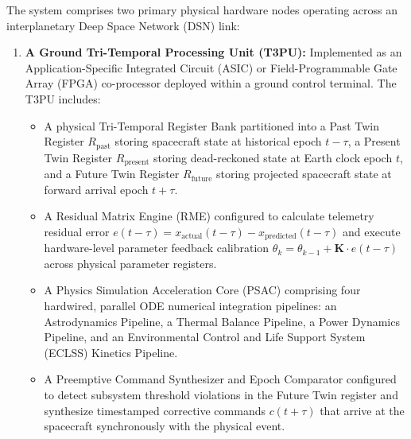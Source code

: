 \documentclass[12pt,a4paper]{article}
\begin{document}
The system comprises two primary physical hardware nodes operating across an interplanetary Deep Space Network (DSN) link:
\begin{enumerate}
    \item \textbf{A Ground Tri-Temporal Processing Unit (T3PU):} Implemented as an Application-Specific Integrated Circuit (ASIC) or Field-Programmable Gate Array (FPGA) co-processor deployed within a ground control terminal. The T3PU includes:
    \begin{itemize}
        \item A physical Tri-Temporal Register Bank partitioned into a Past Twin Register $R_{\text{past}}$ storing spacecraft state at historical epoch $t-\tau$, a Present Twin Register $R_{\text{present}}$ storing dead-reckoned state at Earth clock epoch $t$, and a Future Twin Register $R_{\text{future}}$ storing projected spacecraft state at forward arrival epoch $t+\tau$.
        \item A Residual Matrix Engine (RME) configured to calculate telemetry residual error $e(t-\tau) = x_{\text{actual}}(t-\tau) - x_{\text{predicted}}(t-\tau)$ and execute hardware-level parameter feedback calibration $\theta_k = \theta_{k-1} + \mathbf{K} \cdot e(t-\tau)$ across physical parameter registers.
        \item A Physics Simulation Acceleration Core (PSAC) comprising four hardwired, parallel ODE numerical integration pipelines: an Astrodynamics Pipeline, a Thermal Balance Pipeline, a Power Dynamics Pipeline, and an Environmental Control and Life Support System (ECLSS) Kinetics Pipeline.
        \item A Preemptive Command Synthesizer and Epoch Comparator configured to detect subsystem threshold violations in the Future Twin register and synthesize timestamped corrective commands $c(t+\tau)$ that arrive at the spacecraft synchronously with the physical event.
    \end{itemize}
    

\end{enumerate}
\end{document}

